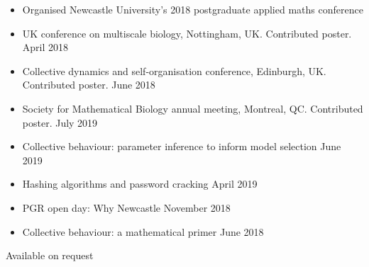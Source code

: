 \documentclass[12pt, a4paper]{article}
\begin{document}
\newpage
{}

\begin{itemize}[align=left,                                                             
                leftmargin=2em,
                itemindent=0pt,
                labelsep=0pt,
                labelwidth=1.5em]
	\item Organised Newcastle University's 2018 postgraduate applied maths conference
	\item UK conference on multiscale biology, Nottingham, UK. Contributed poster. \hfill April 2018
        \item Collective dynamics and self-organisation conference, Edinburgh, UK. Contributed poster. \hfill June 2018
        \item Society for Mathematical Biology annual meeting, Montreal, QC. Contributed poster. \hfill July 2019
\end{itemize}

\begin{itemize}[align=left,                                                             
                leftmargin=2em,
                itemindent=0pt,
                labelsep=0pt,
                labelwidth=1.5em]
        \item Collective behaviour: parameter inference to inform model selection \hfill June 2019
        \item Hashing algorithms and password cracking \hfill April 2019
        \item PGR open day: Why Newcastle \hfill November 2018
        \item Collective behaviour: a mathematical primer \hfill June 2018
\end{itemize}

\vspace{2mm}
Available on request
\end{document}
